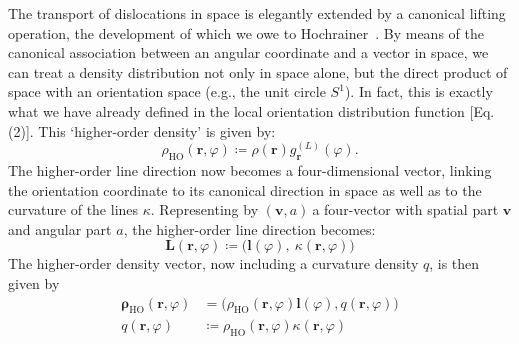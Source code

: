The transport of dislocations in space is elegantly extended by a canonical lifting operation, the development of which we owe to Hochrainer~\cite{Hochrainer2007}. By means of the canonical association between an angular coordinate and a vector in space, we can treat a density distribution not only in space alone, but the direct product of space with an orientation space (e.g., the unit circle $S^{1}$). In fact, this is exactly what we have already defined in the local orientation distribution function {[}Eq. (2){]}. This `higher-order density' is given by:
\begin{equation}\rho_{\text{HO}}\left( \boldsymbol{r},\varphi \right) \coloneqq \rho\left( \boldsymbol{r} \right)g^{(L)}_{\boldsymbol{r}}(\varphi).\label{eq:26_HOdef}\end{equation}
The higher-order line direction now becomes a four-dimensional vector,
linking the orientation coordinate to its canonical direction in space
as well as to the curvature of the lines \(\kappa\). Representing by
\((\boldsymbol{v},a)\ \)a four-vector with spatial part \(\boldsymbol{v}\) and
angular part \(a\), the higher-order line direction becomes:
\begin{equation}
\boldsymbol{L}\left( \boldsymbol{r},\varphi \right) \coloneqq \Big( \boldsymbol{l}(\varphi),\ \kappa\left( \boldsymbol{r},\varphi \right) \Big)
\end{equation}
The higher-order density vector, now including a curvature density $q$, is then given by
\begin{align}
    \boldsymbol{\rho}_\text{HO}\left( \boldsymbol{r},\varphi \right)&=\Big( \rho_\text{HO}\left( \boldsymbol{r},\varphi \right)\boldsymbol{l}(\varphi),q\left( \boldsymbol{r},\varphi \right) \Big)\\
    q\left( \boldsymbol{r},\varphi \right) &\coloneqq \rho_\text{HO}\left( \boldsymbol{r},\varphi \right)\kappa(\boldsymbol{r},\varphi)
\end{align}

